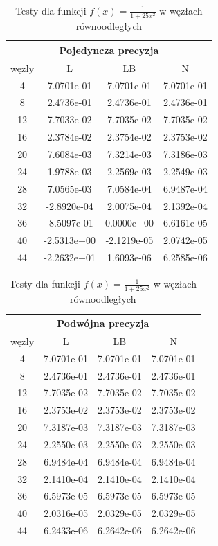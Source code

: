 \documentclass[a4paper]{article}
\begin{document}
\begin{table}[!h]
  \begin{minipage}{.55\linewidth}
    \begin{tabular}{c|ccc}
      \multicolumn{4}{c}{Pojedyncza precyzja}\\
      \hline \hline
      węzły & L & LB & N \\
      \hline
4 & 7.0701e-01 & 7.0701e-01 & 7.0701e-01\\
8 & 2.4736e-01 & 2.4736e-01 & 2.4736e-01\\
12 & 7.7033e-02 & 7.7035e-02 & 7.7035e-02\\
16 & 2.3784e-02 & 2.3754e-02 & 2.3753e-02\\
20 & 7.6084e-03 & 7.3214e-03 & 7.3186e-03\\
24 & 1.9788e-03 & 2.2569e-03 & 2.2549e-03\\
28 & 7.0565e-03 & 7.0584e-04 & 6.9487e-04\\
32 & -2.8920e-04 & 2.0075e-04 & 2.1392e-04\\
36 & -8.5097e-01 & 0.0000e+00 & 6.6161e-05\\
40 & -2.5313e+00 & -2.1219e-05 & 2.0742e-05\\
44 & -2.2632e+01 & 1.6093e-06 & 6.2585e-06\\
    \end{tabular}
  \end{minipage}%
  \begin{minipage}{.55\linewidth}
    \begin{tabular}{c|ccc}
      \multicolumn{4}{c}{Podwójna precyzja}\\
      \hline \hline
      węzły & L & LB & N \\
      \hline
4 & 7.0701e-01 & 7.0701e-01 & 7.0701e-01\\
8 & 2.4736e-01 & 2.4736e-01 & 2.4736e-01\\
12 & 7.7035e-02 & 7.7035e-02 & 7.7035e-02\\
16 & 2.3753e-02 & 2.3753e-02 & 2.3753e-02\\
20 & 7.3187e-03 & 7.3187e-03 & 7.3187e-03\\
24 & 2.2550e-03 & 2.2550e-03 & 2.2550e-03\\
28 & 6.9484e-04 & 6.9484e-04 & 6.9484e-04\\
32 & 2.1410e-04 & 2.1410e-04 & 2.1410e-04\\
36 & 6.5973e-05 & 6.5973e-05 & 6.5973e-05\\
40 & 2.0316e-05 & 2.0329e-05 & 2.0329e-05\\
44 & 6.2433e-06 & 6.2642e-06 & 6.2642e-06\\
    \end{tabular}
  \end{minipage}
  \caption{Testy dla funkcji $f(x) = \frac{1}{1+25x^2}$ w węzłach równoodległych}
\end{table}
\end{document}
